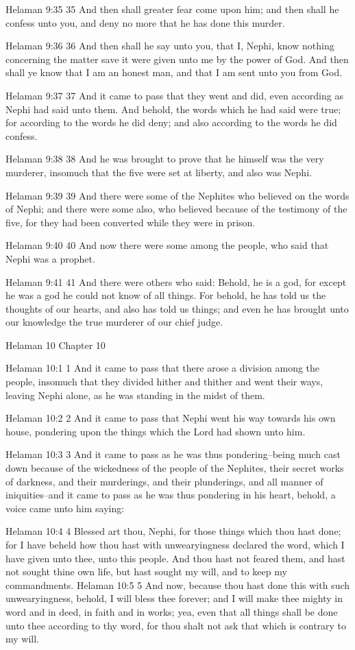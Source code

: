 Helaman 9:35
 35 And then shall greater fear come upon him; and then shall he
confess unto you, and deny no more that he has done this murder.

Helaman 9:36
 36 And then shall he say unto you, that I, Nephi, know nothing
concerning the matter save it were given unto me by the power of
God. And then shall ye know that I am an honest man, and that I
am sent unto you from God.

Helaman 9:37
 37 And it came to pass that they went and did, even according as
Nephi had said unto them. And behold, the words which he had
said were true; for according to the words he did deny; and also
according to the words he did confess.

Helaman 9:38
 38 And he was brought to prove that he himself was the very
murderer, insomuch that the five were set at liberty, and also
was Nephi.

Helaman 9:39
 39 And there were some of the Nephites who believed on the words
of Nephi; and there were some also, who believed because of the
testimony of the five, for they had been converted while they
were in prison.

Helaman 9:40
 40 And now there were some among the people, who said that Nephi
was a prophet.

Helaman 9:41
 41 And there were others who said: Behold, he is a god, for
except he was a god he could not know of all things. For behold,
he has told us the thoughts of our hearts, and also has told us
things; and even he has brought unto our knowledge the true
murderer of our chief judge.

Helaman 10
Chapter 10

Helaman 10:1
 1 And it came to pass that there arose a division among the
people, insomuch that they divided hither and thither and went
their ways, leaving Nephi alone, as he was standing in the midst
of them.

Helaman 10:2
 2 And it came to pass that Nephi went his way towards his own
house, pondering upon the things which the Lord had shown unto
him.

Helaman 10:3
 3 And it came to pass as he was thus pondering--being much cast
down because of the wickedness of the people of the Nephites,
their secret works of darkness, and their murderings, and their
plunderings, and all manner of iniquities--and it came to pass as
he was thus pondering in his heart, behold, a voice came unto him
saying:

Helaman 10:4
 4 Blessed art thou, Nephi, for those things which thou hast
done; for I have beheld how thou hast with unwearyingness
declared the word, which I have given unto thee, unto this
people. And thou hast not feared them, and hast not sought thine
own life, but hast sought my will, and to keep my commandments.
Helaman 10:5
 5 And now, because thou hast done this with such unwearyingness,
behold, I will bless thee forever; and I will make thee mighty in
word and in deed, in faith and in works; yea, even that all
things shall be done unto thee according to thy word, for thou
shalt not ask that which is contrary to my will.

